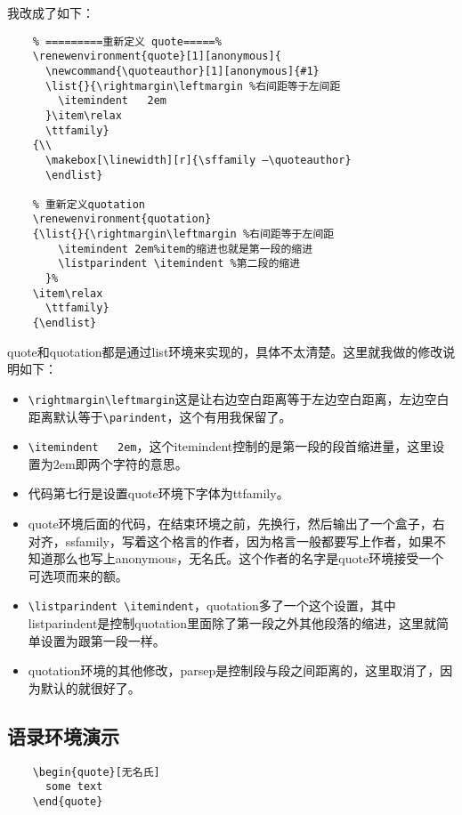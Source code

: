 \documentclass[11pt,oneside]{book}
\begin{document}
  我改成了如下：
  \begin{Verbatim}
    % =========重新定义 quote=====%
    \renewenvironment{quote}[1][anonymous]{
      \newcommand{\quoteauthor}[1][anonymous]{#1}
      \list{}{\rightmargin\leftmargin %右间距等于左间距
        \itemindent   2em
      }\item\relax
      \ttfamily}
    {\\
      \makebox[\linewidth][r]{\sffamily —\quoteauthor}
      \endlist}

    % 重新定义quotation
    \renewenvironment{quotation}
    {\list{}{\rightmargin\leftmargin %右间距等于左间距
        \itemindent 2em%item的缩进也就是第一段的缩进
        \listparindent \itemindent %第二段的缩进
      }%
    \item\relax
      \ttfamily}
    {\endlist}
  \end{Verbatim}
  quote和quotation都是通过list环境来实现的，具体不太清楚。这里就我做的修改说明如下：
  \begin{itemize}
  \item \verb+\rightmargin\leftmargin+这是让右边空白距离等于左边空白距离，左边空白距离默认等于\verb+\parindent+，这个有用我保留了。
  \item \verb+\itemindent   2em+，这个itemindent控制的是第一段的段首缩进量，这里设置为2em即两个字符的意思。
  \item 代码第七行是设置quote环境下字体为ttfamily。
  \item quote环境后面的代码，在结束环境之前，先换行，然后输出了一个盒子，右对齐，ssfamily，写着这个格言的作者，因为格言一般都要写上作者，如果不知道那么也写上anonymous，无名氏。这个作者的名字是quote环境接受一个可选项而来的额。
  \item \verb+\listparindent \itemindent+，quotation多了一个这个设置，其中listparindent是控制quotation里面除了第一段之外其他段落的缩进，这里就简单设置为跟第一段一样。
  \item quotation环境的其他修改，parsep是控制段与段之间距离的，这里取消了，因为默认的就很好了。
  \end{itemize}

  \subsection{语录环境演示}
  \begin{Verbatim}
    \begin{quote}[无名氏]
      some text
    \end{quote}
  \end{Verbatim}
\end{document}
